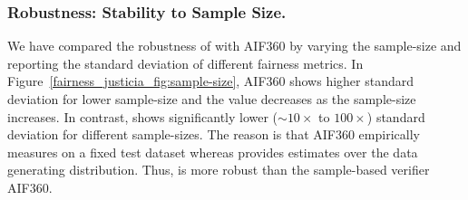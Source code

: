 \subsubsection{Robustness: Stability to Sample Size.} 
We have compared the robustness of {\justicia} with AIF360 by varying the sample-size and reporting the standard deviation of different fairness metrics. 
In Figure~\ref{fairness_justicia_fig:sample-size}, AIF360 shows higher standard deviation for lower sample-size and the value decreases as  the sample-size increases. 
In contrast, {\justicia} shows significantly lower ($\sim10\times$ to $100\times$) standard deviation for different sample-sizes. 
The reason is that AIF360 empirically measures on a fixed test dataset whereas {\justicia} provides estimates over the data generating distribution.
Thus, {\justicia} is more robust than the sample-based verifier AIF360.

